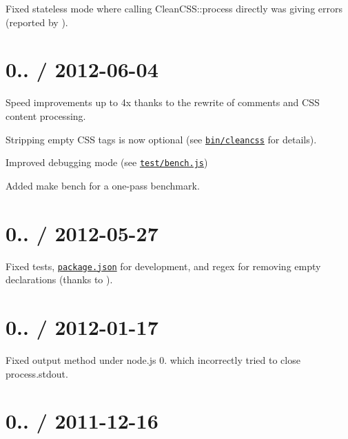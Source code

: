\begin{DoxyItemize}
\item Fixed stateless mode where calling {\ttfamily Clean\+C\+S\+S\+::process} directly was giving errors (reported by \href{https://github.com/facelessuser}{\tt }).
\end{DoxyItemize}

\section*{0.. / 2012-\/06-\/04 }


\begin{DoxyItemize}
\item Speed improvements up to 4x thanks to the rewrite of comments and C\+SS\textquotesingle{} content processing.
\item Stripping empty C\+SS tags is now optional (see \href{/bin/cleancss}{\tt bin/cleancss} for details).
\item Improved debugging mode (see \href{/test/bench.js}{\tt test/bench.\+js})
\item Added {\ttfamily make bench} for a one-\/pass benchmark.
\end{DoxyItemize}

\section*{0.. / 2012-\/05-\/27 }


\begin{DoxyItemize}
\item Fixed tests, \href{/package.json}{\tt package.\+json} for development, and regex for removing empty declarations (thanks to \href{https://github.com/vvo}{\tt }).
\end{DoxyItemize}

\section*{0.. / 2012-\/01-\/17 }


\begin{DoxyItemize}
\item Fixed output method under node.\+js 0. which incorrectly tried to close {\ttfamily process.\+stdout}.
\end{DoxyItemize}

\section*{0.. / 2011-\/12-\/16 }



